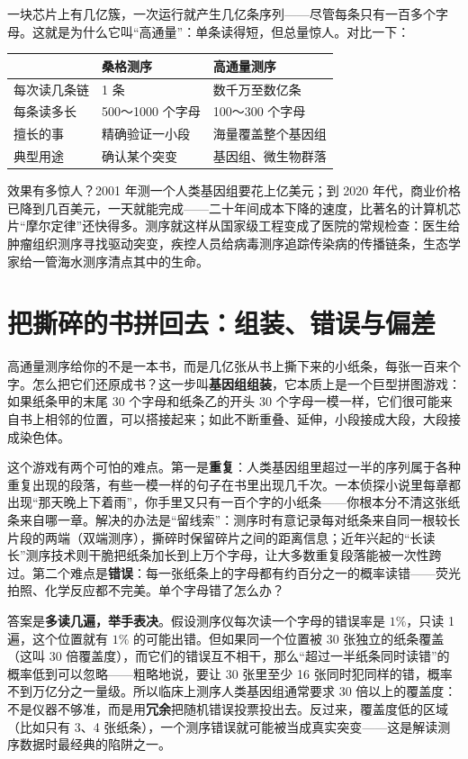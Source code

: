 一块芯片上有几亿簇，一次运行就产生几亿条序列——尽管每条只有一百多个字母。这就是为什么它叫“高通量”：单条读得短，但总量惊人。对比一下：

\begin{table}[htbp]
\centering
\begin{tabular}{lll}
\toprule
 & 桑格测序 & 高通量测序 \\
\midrule
每次读几条链 & 1 条 & 数千万至数亿条 \\
每条读多长 & 500～1000 个字母 & 100～300 个字母 \\
擅长的事 & 精确验证一小段 & 海量覆盖整个基因组 \\
典型用途 & 确认某个突变 & 基因组、微生物群落 \\
\bottomrule
\end{tabular}
\end{table}

效果有多惊人？2001 年测一个人类基因组要花上亿美元；到 2020 年代，商业价格已降到几百美元，一天就能完成——二十年间成本下降的速度，比著名的计算机芯片“摩尔定律”还快得多。测序就这样从国家级工程变成了医院的常规检查：医生给肿瘤组织测序寻找驱动突变，疾控人员给病毒测序追踪传染病的传播链条，生态学家给一管海水测序清点其中的生命。

\section{把撕碎的书拼回去：组装、错误与偏差}

高通量测序给你的不是一本书，而是几亿张从书上撕下来的小纸条，每张一百来个字。怎么把它们还原成书？这一步叫\textbf{基因组组装}，它本质上是一个巨型拼图游戏：如果纸条甲的末尾 30 个字母和纸条乙的开头 30 个字母一模一样，它们很可能来自书上相邻的位置，可以搭接起来；如此不断重叠、延伸，小段接成大段，大段接成染色体。

这个游戏有两个可怕的难点。第一是\textbf{重复}：人类基因组里超过一半的序列属于各种重复出现的段落，有些一模一样的句子在书里出现几千次。一本侦探小说里每章都出现“那天晚上下着雨”，你手里又只有一百个字的小纸条——你根本分不清这张纸条来自哪一章。解决的办法是“留线索”：测序时有意记录每对纸条来自同一根较长片段的两端（双端测序），撕碎时保留碎片之间的距离信息；近年兴起的“长读长”测序技术则干脆把纸条加长到上万个字母，让大多数重复段落能被一次性跨过。第二个难点是\textbf{错误}：每一张纸条上的字母都有约百分之一的概率读错——荧光拍照、化学反应都不完美。单个字母错了怎么办？

\begin{qiaoliang}
答案是\textbf{多读几遍，举手表决}。假设测序仪每次读一个字母的错误率是 $1\%$，只读 1 遍，这个位置就有 $1\%$ 的可能出错。但如果同一个位置被 30 张独立的纸条覆盖（这叫 30 倍覆盖度），而它们的错误互不相干，那么“超过一半纸条同时读错”的概率低到可以忽略——粗略地说，要让 30 张里至少 16 张同时犯同样的错，概率不到万亿分之一量级。所以临床上测序人类基因组通常要求 30 倍以上的覆盖度：不是仪器不够准，而是用\textbf{冗余}把随机错误投票投出去。反过来，覆盖度低的区域（比如只有 3、4 张纸条），一个测序错误就可能被当成真实突变——这是解读测序数据时最经典的陷阱之一。
\end{qiaoliang}

